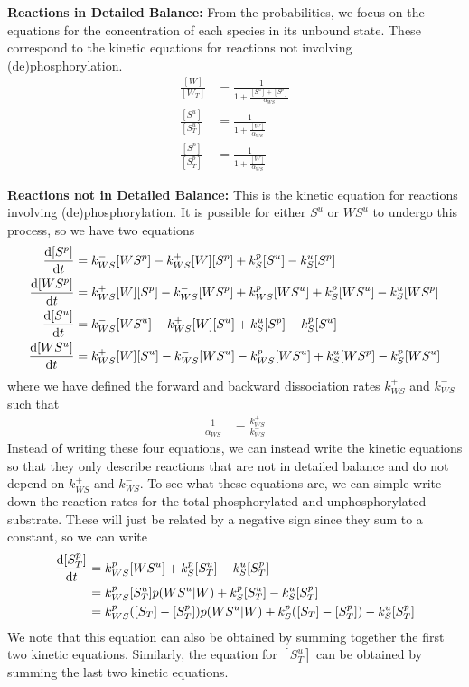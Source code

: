 \documentclass[aps,onecolumn,superscriptaddress,notitlepage]{revtex4-1}
\begin{document}
\textbf{Reactions in Detailed Balance:}
From the probabilities, we focus on the equations for the concentration of each species in its unbound state.
These correspond to the kinetic equations for reactions not involving (de)phosphorylation.
\begin{align}
\frac{[W]}{[W_T]} & = \frac{1}{1 + \frac{[S^u] +[S^p]}{\alpha_{WS}}}\label{eq:onewayW}\\
\frac{[S^u]}{[S^u_T]} &= \frac{1}{1 + \frac{[W]}{\alpha_{WS}}}\label{eq:onewaySu}\\
\frac{[S^p]}{[S^p_T]} &=  \frac{1}{1 + \frac{[W]}{\alpha_{WS}}}\label{eq:onewaySp}
\end{align}

\textbf{Reactions not in  Detailed Balance:}
This is the kinetic equation for reactions involving (de)phosphorylation. 
It is possible for either $S^u$ or $WS^u$ to undergo this process, so we have two equations
\begin{align}
\dv{[S^p]}{t} &=  k_{WS}^-[WS^p] - k_{WS}^+[W][S^p] + k_S^p[S^u] - k_S^u[S^p]\\
\dv{[WS^p]}{t} &= k_{WS}^+[W][S^p] -k_{WS}^-[WS^p] + k_{WS}^p[WS^u] + k_S^p[WS^u] - k_S^u[WS^p]\\
\dv{[S^u]}{t} &=  k_{WS}^-[WS^u] - k_{WS}^+[W][S^u] + k_S^u[S^p] - k_S^p[S^u]\\
\dv{[WS^u]}{t} &= k_{WS}^+[W][S^u] -k_{WS}^-[WS^u] - k_{WS}^p[WS^u] + k_S^u[WS^p] - k_S^p[WS^u]
\end{align}
where we have defined the forward and backward dissociation rates $k_{WS}^+$ and $k_{WS}^-$ such that
\begin{align}
\frac{1}{\alpha_{WS}} &= \frac{k_{WS}^+}{k_{WS}^-}
\end{align}
Instead of writing these four equations, we can instead write the kinetic equations so that they only describe reactions that are not in detailed balance and do not depend on $k_{WS}^+$ and $k_{WS}^-$. To see what these equations are, we can simple write down the reaction rates for the total phosphorylated and unphosphorylated substrate.
These will just be related by a negative sign since they sum to a constant, so we can write
\begin{align}
\dv{[S^p_T]}{t} &= k_{WS}^p[WS^u] + k_S^p[S_T^u] - k_S^u[S_T^p]\\
&= k_{WS}^p[S_T^u]p(WS^u|W) + k_S^p[S_T^u] - k_S^u[S_T^p]\\
&= k_{WS}^p([S_T]-[S_T^p])p(WS^u|W) + k_S^p([S_T]-[S_T^p]) - k_S^u[S_T^p]
\end{align}
We note that this equation can also be obtained by summing together the first two kinetic equations. Similarly, the equation for $[S^u_T]$ can be obtained by summing the last two kinetic equations.
\end{document}
